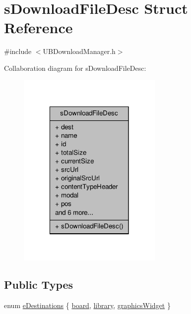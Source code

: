 \hypertarget{structs_download_file_desc}{\section{s\-Download\-File\-Desc Struct Reference}
\label{d5/d15/structs_download_file_desc}
}


{\ttfamily \#include $<$U\-B\-Download\-Manager.\-h$>$}



Collaboration diagram for s\-Download\-File\-Desc\-:
\nopagebreak
\begin{figure}[H]
\begin{center}
\leavevmode
\includegraphics[width=198pt]{d5/dfe/structs_download_file_desc__coll__graph}
\end{center}
\end{figure}
\subsection*{Public Types}
\begin{DoxyCompactItemize}
\item 
enum \hyperlink{structs_download_file_desc_ad995f6191451705cb58a55a5dff81967}{e\-Destinations} \{ \hyperlink{structs_download_file_desc_ad995f6191451705cb58a55a5dff81967a6ef5ab3b2839a0d96153d3c9c51923d3}{board}, 
\hyperlink{structs_download_file_desc_ad995f6191451705cb58a55a5dff81967a806447250426771aa072c85cebddafb2}{library}, 
\hyperlink{structs_download_file_desc_ad995f6191451705cb58a55a5dff81967ae864913bd9830ff680cb0ea069586055}{graphics\-Widget}
 \}
\end{DoxyCompactItemize}
